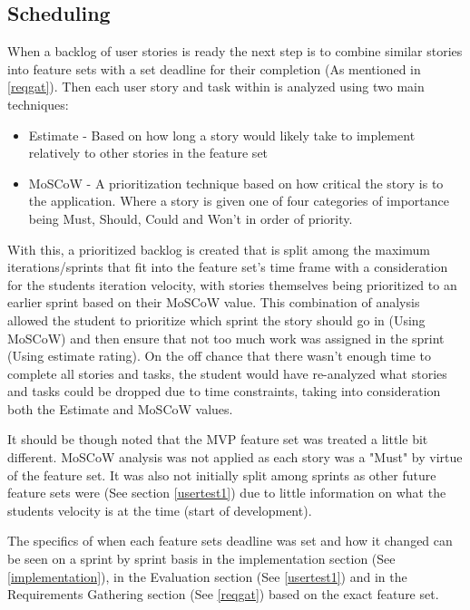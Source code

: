 \subsection{Scheduling} \label{scheduling}
When a backlog of user stories is ready the next step is to combine similar stories into feature sets with a set deadline for their completion (As mentioned in \ref{reqgat}). Then each user story and task within is analyzed using two main techniques:
\begin{itemize}
    \item Estimate - Based on how long a story would likely take to implement relatively to other stories in the feature set
    \item MoSCoW - A prioritization technique based on how critical the story is to the application. Where a story is given one of four categories of importance being Must, Should, Could and Won't in order of priority. \cite{articleMoscow}
\end{itemize}
With this, a prioritized backlog is created that is split among the maximum iterations/sprints that fit into the feature set's time frame with a consideration for the students iteration velocity, with stories themselves being prioritized to an earlier sprint based on their MoSCoW value. This combination of analysis allowed the student to prioritize which sprint the story should go in (Using MoSCoW) and then ensure that not too much work was assigned in the sprint (Using estimate rating). On the off chance that there wasn't enough time to complete all stories and tasks, the student would have re-analyzed what stories and tasks could be dropped due to time constraints, taking into consideration both the Estimate and MoSCoW values.

It should be though noted that the MVP feature set was treated a little bit different. MoSCoW analysis was not applied as each story was a "Must" by virtue of the feature set. It was also not initially split among sprints as other future feature sets were (See section \ref{usertest1}) due to little information on what the students velocity is at the time (start of development).

The specifics of when each feature sets deadline was set and how it changed can be seen on a sprint by sprint basis in the implementation section (See \ref{implementation}), in the Evaluation section (See \ref{usertest1}) and in the Requirements Gathering section (See \ref{reqgat}) based on the exact feature set.


